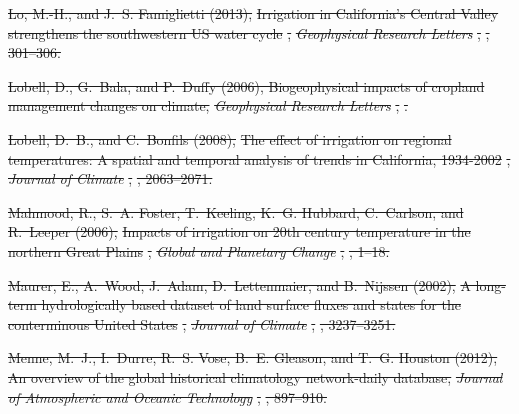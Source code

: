 \documentclass[draft,ms]{agutex}   %
\providecommand{\DIFdel}[1]{{\protect\color{red}\sout{#1}}}                      %
\begin{document}
\begin{article}
\DIFdel{Lo, M.-H., and J.~S. Famiglietti (2013), }%
\DIFdel{Irrigation in California's Central
  Valley strengthens the southwestern US water cycle}%
\DIFdel{, }\textit{\DIFdel{Geophysical
  Research Letters}}%
\DIFdel{, }%
\DIFdel{, 301--306.
}%

\DIFdel{Lobell, D., G.~Bala, and P.~Duffy (2006), Biogeophysical impacts of cropland
  management changes on climate, }\textit{\DIFdel{Geophysical Research Letters}}%
\DIFdel{,
  }%
\DIFdel{.
}%

\DIFdel{Lobell, D.~B., and C.~Bonfils (2008), }%
\DIFdel{The effect of irrigation on regional
  temperatures: A spatial and temporal analysis of trends in California,
  1934-2002}%
\DIFdel{, }\textit{\DIFdel{Journal of Climate}}%
\DIFdel{, }%
\DIFdel{, 2063--2071.
}%

\DIFdel{Mahmood, R., S.~A. Foster, T.~Keeling, K.~G. Hubbard, C.~Carlson, and R.~Leeper
  (2006), }%
\DIFdel{Impacts of irrigation on 20th century temperature in the northern
  Great Plains}%
\DIFdel{, }\textit{\DIFdel{Global and Planetary Change}}%
\DIFdel{, }%
\DIFdel{, 1--18.
}%

\DIFdel{Maurer, E., A.~Wood, J.~Adam, D.~Lettenmaier, and B.~Nijssen (2002), }%
\DIFdel{A
  long-term hydrologically based dataset of land surface fluxes and states for
  the conterminous United States}%
\DIFdel{, }\textit{\DIFdel{Journal of Climate}}%
\DIFdel{,
  }%
\DIFdel{, 3237--3251.
}%

\DIFdel{Menne, M.~J., I.~Durre, R.~S. Vose, B.~E. Gleason, and T.~G. Houston (2012), An
  overview of the global historical climatology network-daily database,
  }\textit{\DIFdel{Journal of Atmospheric and Oceanic Technology}}%
\DIFdel{, }%
\DIFdel{,
  897--910.
}%


\end{article}
\end{document}
